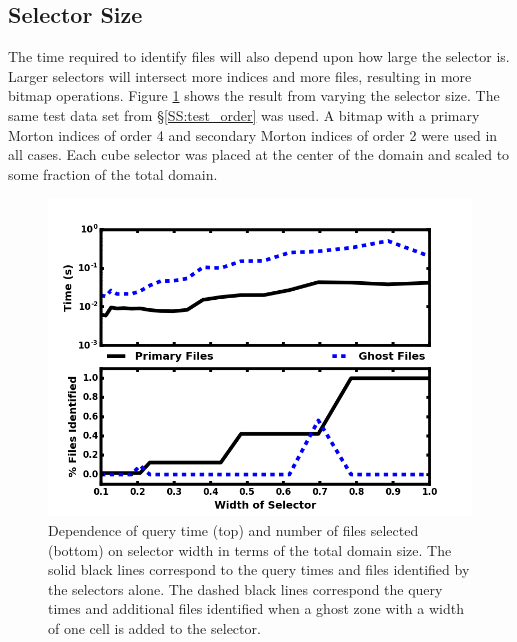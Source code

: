 \documentclass[apjl]{emulateapj}
\begin{document}
\subsection{Selector Size}\label{SS:test_size}
%
The time required to identify files will also depend upon how large the selector is. Larger selectors will intersect more indices and more files, resulting in more bitmap operations. Figure \ref{fig:test_size} shows the result from varying the selector size. The same test data set from \S\ref{SS:test_order} was used. A bitmap with a primary Morton indices of order 4 and secondary Morton indices of order 2 were used in all cases. Each cube selector was placed at the center of the domain and scaled to some fraction of the total domain.
%
\begin{figure}[htbp]
\begin{center}
\includegraphics[width=\columnwidth,keepaspectratio]{../images/vary_selector_np1024_nf512.png}
\caption{Dependence of query time (top) and number of files selected (bottom) on selector width in terms of the total domain size. The solid black lines correspond to the query times and files identified by the selectors alone. The dashed black lines correspond the query times and additional files identified when a ghost zone with a width of one cell is added to the selector.}
\label{fig:test_size}
\end{center}
\end{figure}
%
\end{document}
